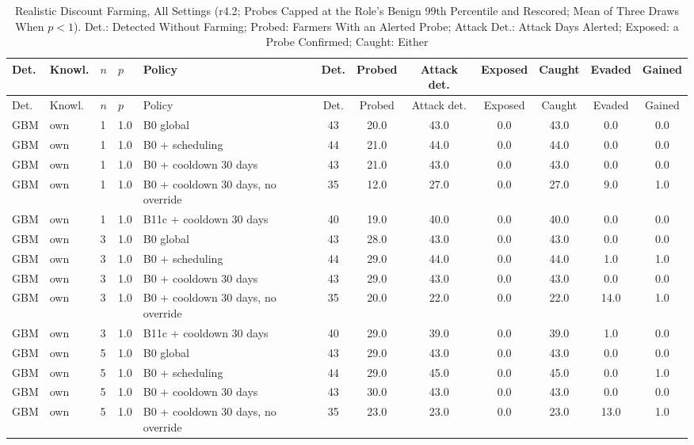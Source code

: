 \documentclass[10pt,onecolumn,letterpaper]{article}
\begin{document}
\begin{longtable}{lllllccccccc}
\caption{Realistic Discount Farming, All Settings (r4.2; Probes Capped at the Role's Benign 99th Percentile and Rescored; Mean of Three Draws When $p<1$). Det.: Detected Without Farming; Probed: Farmers With an Alerted Probe; Attack Det.: Attack Days Alerted; Exposed: a Probe Confirmed; Caught: Either\label{tab:e-l3-r42}}\\
\toprule
Det. & Knowl. & $n$ & $p$ & Policy & Det. & Probed & Attack det. & Exposed & Caught & Evaded & Gained \\
\midrule
\endfirsthead
\toprule
Det. & Knowl. & $n$ & $p$ & Policy & Det. & Probed & Attack det. & Exposed & Caught & Evaded & Gained \\
\midrule
\endhead
GBM & own & 1 & 1.0 & B0 global & 43 & 20.0 & 43.0 & 0.0 & 43.0 & 0.0 & 0.0 \\
GBM & own & 1 & 1.0 & B0 + scheduling & 44 & 21.0 & 44.0 & 0.0 & 44.0 & 0.0 & 0.0 \\
GBM & own & 1 & 1.0 & B0 + cooldown 30 days & 43 & 21.0 & 43.0 & 0.0 & 43.0 & 0.0 & 0.0 \\
GBM & own & 1 & 1.0 & B0 + cooldown 30 days, no override & 35 & 12.0 & 27.0 & 0.0 & 27.0 & 9.0 & 1.0 \\
GBM & own & 1 & 1.0 & B11c + cooldown 30 days & 40 & 19.0 & 40.0 & 0.0 & 40.0 & 0.0 & 0.0 \\
GBM & own & 3 & 1.0 & B0 global & 43 & 28.0 & 43.0 & 0.0 & 43.0 & 0.0 & 0.0 \\
GBM & own & 3 & 1.0 & B0 + scheduling & 44 & 29.0 & 44.0 & 0.0 & 44.0 & 1.0 & 1.0 \\
GBM & own & 3 & 1.0 & B0 + cooldown 30 days & 43 & 29.0 & 43.0 & 0.0 & 43.0 & 0.0 & 0.0 \\
GBM & own & 3 & 1.0 & B0 + cooldown 30 days, no override & 35 & 20.0 & 22.0 & 0.0 & 22.0 & 14.0 & 1.0 \\
GBM & own & 3 & 1.0 & B11c + cooldown 30 days & 40 & 29.0 & 39.0 & 0.0 & 39.0 & 1.0 & 0.0 \\
GBM & own & 5 & 1.0 & B0 global & 43 & 29.0 & 43.0 & 0.0 & 43.0 & 0.0 & 0.0 \\
GBM & own & 5 & 1.0 & B0 + scheduling & 44 & 29.0 & 45.0 & 0.0 & 45.0 & 0.0 & 1.0 \\
GBM & own & 5 & 1.0 & B0 + cooldown 30 days & 43 & 30.0 & 43.0 & 0.0 & 43.0 & 0.0 & 0.0 \\
GBM & own & 5 & 1.0 & B0 + cooldown 30 days, no override & 35 & 23.0 & 23.0 & 0.0 & 23.0 & 13.0 & 1.0 \\

\end{longtable}
\end{document}
